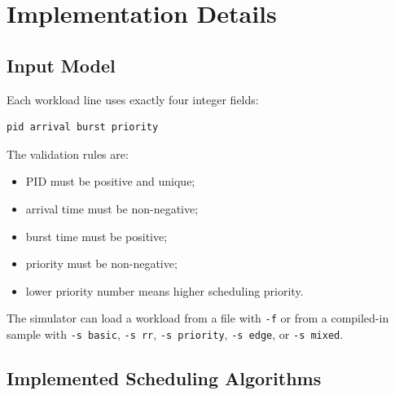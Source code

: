 \documentclass[11pt]{article}
\begin{document}
\section{Implementation Details}

\subsection{Input Model}

Each workload line uses exactly four integer fields:

\begin{lstlisting}[style=code]
pid arrival burst priority
\end{lstlisting}

The validation rules are:

\begin{itemize}
  \item PID must be positive and unique;
  \item arrival time must be non-negative;
  \item burst time must be positive;
  \item priority must be non-negative;
  \item lower priority number means higher scheduling priority.
\end{itemize}

The simulator can load a workload from a file with \texttt{-f} or from a
compiled-in sample with \texttt{-s basic}, \texttt{-s rr},
\texttt{-s priority}, \texttt{-s edge}, or \texttt{-s mixed}.

\subsection{Implemented Scheduling Algorithms}
\end{document}
